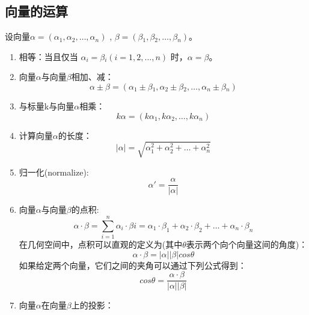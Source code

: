 \documentclass[a4paper,10pt]{article}
\begin{document}
\begin{CJK}{UTF8}{song}
\subsection{向量的运算}
设向量$\alpha=(\alpha{}_{1},\alpha{}_{2},\ldots{},\alpha{}_{n})$ , $\beta=(\beta{}_{1},\beta{}_{2},\ldots{},\beta{}_{n})$。
\begin{enumerate}
 \item 相等：当且仅当 $\alpha{}_{i}=\beta{}_{i} (i=1,2,\ldots{},n)$ 时，$\alpha=\beta$。
\item 向量$\alpha$与向量$\beta$相加、减：
\begin{displaymath}
\alpha{}\pm{}\beta{}=(\alpha{}_{1}\pm{}\beta{}_{1},\alpha{}_{2}\pm{}\beta{}_{2},\ldots{},\alpha{}_{n}\pm{}\beta{}_{n})
\end{displaymath}
\item 与标量k与向量$\alpha$相乘：
\begin{displaymath}
k\alpha=(k\alpha{}_{1},k\alpha{}_{2},\ldots{},k\alpha{}_{n})
\end{displaymath}
\item 计算向量$\alpha$的长度：
\begin{displaymath}
|\alpha|=\sqrt{\alpha_{1}^{2}+\alpha_{2}^{2}+\ldots{}+\alpha_{n}^{2}}
\end{displaymath}
\item 归一化(normalize):
\begin{displaymath}
\alpha'=\frac{\alpha}{|\alpha|}
\end{displaymath}
\item 向量$\alpha$与向量$\beta$的点积:
\begin{displaymath}
\alpha\cdot\beta=\sum_{i=1}^{n}\alpha_{i}\cdot\beta{i}=\alpha_{1}\cdot\beta_{1}+\alpha_{2}\cdot\beta_{2}+\ldots{}+\alpha_{n}\cdot\beta_{n}
\end{displaymath}
在几何空间中，点积可以直观的定义为(其中$\theta$表示两个向个向量这间的角度)：
\begin{displaymath}
 \alpha\cdot\beta=|\alpha||\beta|cos\theta
\end{displaymath}
如果给定两个向量，它们之间的夹角可以通过下列公式得到：
\begin{displaymath}
cos\theta=\frac{\alpha\cdot\beta}{|\alpha||\beta|}
\end{displaymath}
\item 向量$\alpha$在向量$\beta$上的投影：


\end{enumerate}
\end{CJK}
\end{document}
